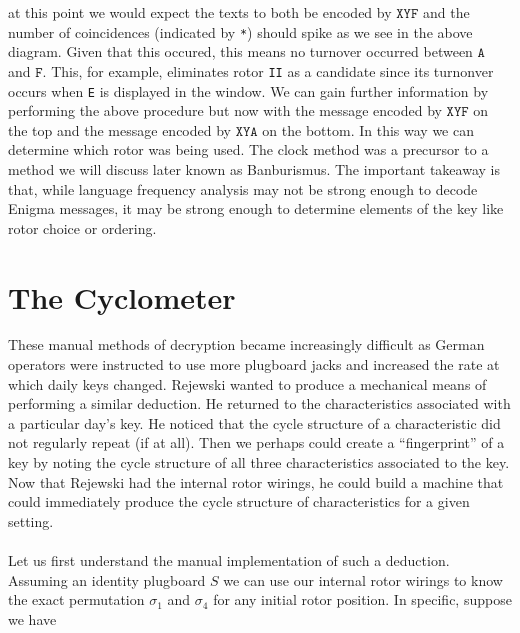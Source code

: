at this point we would expect the texts to both be encoded by
$\texttt{XYF}$ and the number of coincidences (indicated by
\texttt{*}) should spike as we see in the above diagram. Given that
this occured, this means no turnover occurred between $\texttt{A}$ and
$\texttt{F}$. This, for example, eliminates rotor \texttt{II} as a
candidate since its turnonver occurs when \texttt{E} is displayed in
the window. We can gain further information by performing the above
procedure but now with the message encoded by $\texttt{XYF}$ on the
top and the message encoded by $\texttt{XYA}$ on the bottom. In this
way we can determine which rotor was being used. The clock method was
a precursor to a method we will discuss later known as Banburismus.
The important takeaway is that, while language frequency analysis may not be
strong enough to decode Enigma messages, it may be strong enough to
determine elements of the key like rotor choice or ordering.

\section{The Cyclometer}

These manual methods of decryption became increasingly difficult as
German operators were instructed to use more plugboard jacks and
increased the rate at which daily keys changed. Rejewski wanted to
produce a mechanical means of performing a similar deduction. He
returned to the characteristics associated with a particular day's
key. He noticed that the cycle structure of a characteristic did not
regularly repeat (if at all). Then we perhaps could create a
``fingerprint'' of a key by noting the cycle structure of all three
characteristics associated to the key. Now that Rejewski had the
internal rotor wirings, he could build a machine that could
immediately produce the cycle structure of characteristics for a given setting.
\\\\Let us first understand the manual implementation of such a
deduction. Assuming an identity plugboard $S$ we can use our internal
rotor wirings to know the exact permutation $\sigma_1$ and
$\sigma_4$ for any initial rotor position. In specific, suppose we have

